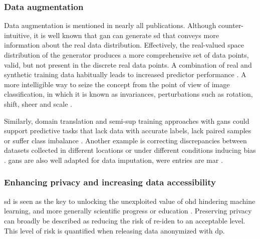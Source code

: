         \subsubsection{Data augmentation}\label{sec:augmentation}
    
            Data augmentation  is mentioned in nearly all publications. Although counter-intuitive, it is well known that \gls{gan} can generate \gls{sd} that conveys more information about the real data distribution. Effectively, the real-valued space distribution of the generator produces a more comprehensive set of data points, valid, but not present in the discrete real data points. A combination of real and synthetic training data habitually leads to increased predictor performance \cite{Wang_2019,Che_2017,Yoon2018-ite, yoon2018imputation, Yang_2019_impute_ehr, Chen_2019, cui2019conan, Che_2017}. A more intelligible way to seize the concept from the point of view of image classification, in which it is known as invariances, perturbations such as rotation, shift, sheer and scale \cite{antoniou2017data}.\par 
            
            Similarly, domain translation  and \gls{semi-sup} training approaches with \glspl{gan} could support predictive tasks that lack data with accurate labels, lack paired samples or suffer class imbalance \cite{Che_2017,mcdermott2018semi, Yoon2018-ite}. Another example is correcting discrepancies between datasets collected in different locations or under different conditions inducing bias \cite{Yoon2018-radial}. \glspl{gan} are also well adapted for data imputation, were  entries are \gls{mar} \cite{yoon2018imputation}. 

        \subsubsection{Enhancing privacy and increasing data accessibility}\label{sec:access_privacy}
    
            \gls{sd} is seen as the key to unlocking the unexploited value of \gls{ohd} hindering machine learning, and more generally scientific progress \cite{Beaulieu-Jones2019-ct, baowaly_2019_IEEE,baowaly_2019_jamia,Che_2017,esteban2017real,Fisher2019,severo2019ward2icu} or education \cite{laderas_teaching_2018}. Preserving privacy can broadly be described as reducing the risk of \gls{re-iden} to an acceptable level. This level of risk is quantified when releasing data anonymized with \gls{dp}.\par
    
